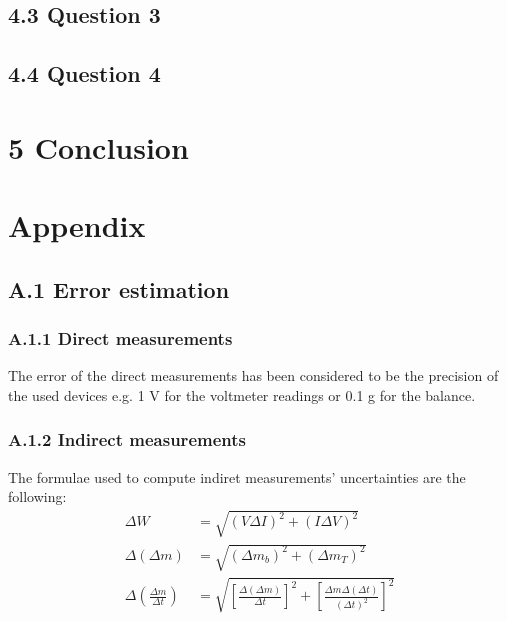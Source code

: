 \documentclass[a4paper, 12pt]{article}
\begin{document}
\subsection{4.3 Question 3}

\subsection{4.4 Question 4}

\section{5 Conclusion}

\newpage
\section{Appendix}
\subsection{A.1 Error estimation}
\subsubsection{A.1.1 Direct measurements}
The error of the direct measurements has been considered to be the precision of the used devices e.g. 1 V for the voltmeter readings or 0.1 g for the balance. 
\subsubsection{A.1.2 Indirect measurements}
The formulae used to compute indiret measurements' uncertainties are the following:
\begin{align}\label{dp}
	\Delta W &= \sqrt{(V\Delta I)^2 + (I \Delta V)^2} \\
	\Delta (\Delta m) &= \sqrt{(\Delta m_b)^2 + (\Delta m_T)^2} \\
	\Delta \left(\frac{\Delta m}{\Delta t}\right) &= \sqrt{\left[\frac{\Delta (\Delta m)}{\Delta t}\right]^2 + \left[\frac{\Delta m \Delta (\Delta t)}{(\Delta t)^2}\right]^2}
\end{align}
\end{document}
